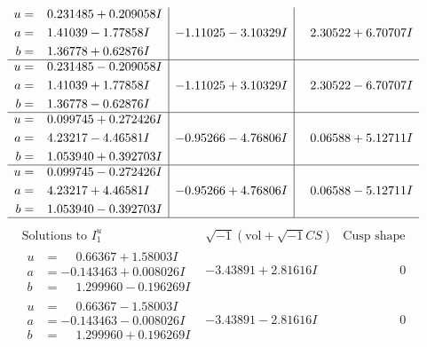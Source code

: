 \documentclass[1p]{elsarticle_modified}
\theoremstyle{definition}
\newcommand{\I}{\sqrt{-1}}
\begin{document}
$$\begin{array}{c|c|c}
\begin{aligned}
u &= \phantom{-}0.231485 + 0.209058 I \\
a &= \phantom{-}1.41039 - 1.77858 I \\
b &= \phantom{-}1.36778 + 0.62876 I\end{aligned}
 & -1.11025 - 3.10329 I & \phantom{-}2.30522 + 6.70707 I \\ \hline\begin{aligned}
u &= \phantom{-}0.231485 - 0.209058 I \\
a &= \phantom{-}1.41039 + 1.77858 I \\
b &= \phantom{-}1.36778 - 0.62876 I\end{aligned}
 & -1.11025 + 3.10329 I & \phantom{-}2.30522 - 6.70707 I \\ \hline\begin{aligned}
u &= \phantom{-}0.099745 + 0.272426 I \\
a &= \phantom{-}4.23217 - 4.46581 I \\
b &= \phantom{-}1.053940 + 0.392703 I\end{aligned}
 & -0.95266 - 4.76806 I & \phantom{-}0.06588 + 5.12711 I \\ \hline\begin{aligned}
u &= \phantom{-}0.099745 - 0.272426 I \\
a &= \phantom{-}4.23217 + 4.46581 I \\
b &= \phantom{-}1.053940 - 0.392703 I\end{aligned}
 & -0.95266 + 4.76806 I & \phantom{-}0.06588 - 5.12711 I\\
 \hline 
 \end{array}$$\newpage$$\begin{array}{c|c|c}  
\text{Solutions to }I^u_{1}& \I (\text{vol} + \sqrt{-1}CS) & \text{Cusp shape}\\
 \hline 
\begin{aligned}
u &= \phantom{-}0.66367 + 1.58003 I \\
a &= -0.143463 + 0.008026 I \\
b &= \phantom{-}1.299960 - 0.196269 I\end{aligned}
 & -3.43891 + 2.81616 I & \phantom{-0.000000 } 0 \\ \hline\begin{aligned}
u &= \phantom{-}0.66367 - 1.58003 I \\
a &= -0.143463 - 0.008026 I \\
b &= \phantom{-}1.299960 + 0.196269 I\end{aligned}
 & -3.43891 - 2.81616 I & \phantom{-0.000000 } 0 \\ \hline\begin{aligned}

\end{aligned}
\end{array}$$
\end{document}
